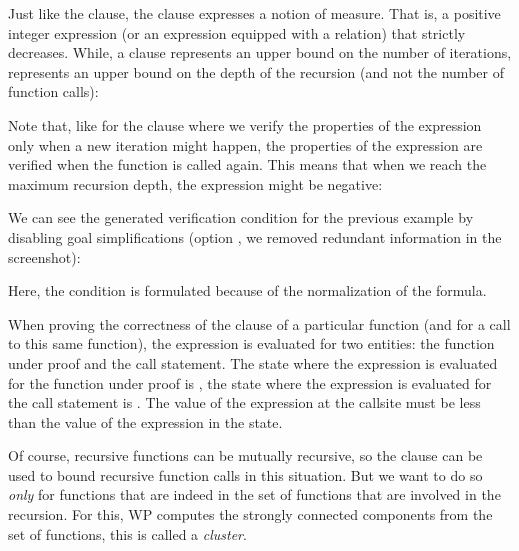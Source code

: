 

Just like the  clause, the 
clause expresses a notion of measure. That is, a positive integer expression
(or an expression equipped with a relation) that strictly decreases. While, a
 clause represents an upper bound on the number of
iterations,  represents an upper bound on the depth of the
recursion (and not the number of function calls):




Note that, like for the  clause where we verify the
properties of the expression only when a new iteration might happen, the
properties of the  expression are verified when the
function is called again. This means that when we reach the maximum recursion
depth, the expression might be negative:




We can see the generated verification condition for the previous example by
disabling goal simplifications (option , we removed
redundant information in the screenshot):



Here, the condition  is formulated
 because of the normalization of the
formula.


When proving the correctness of the  clause of a particular
function (and for a call to this same function), the expression is evaluated
for two entities: the function under proof and the call statement. The state
where the expression is evaluated for the function under proof is
, the state where the expression is evaluated for the call
statement is . The value of the expression at the callsite must
be less than the value of the expression in the  state.




Of course, recursive functions can be mutually recursive, so the
 clause can be used to bound recursive function calls in
this situation. But we want to do so {\em only} for functions that are
indeed in the set of functions that are involved in the recursion. For this, WP
computes the strongly connected components from the set of functions, this is
called a {\em cluster}.

